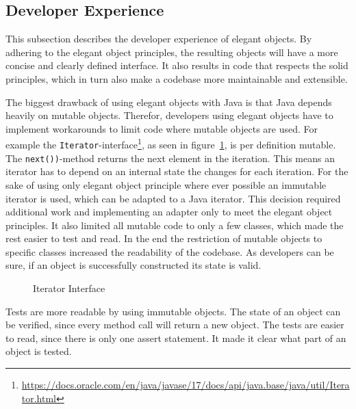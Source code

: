 \subsection{Developer Experience}\label{subsec:developer-experience}
This subsection describes the developer experience of elegant objects.
By adhering to the elegant object principles, the resulting objects will have a more concise and clearly defined interface.
It also results in code that respects the solid principles, which in turn also make a codebase more maintainable and extensible.

The biggest drawback of using elegant objects with Java is that Java depends heavily on mutable objects.
Therefor, developers using elegant objects have to implement workarounds to limit code where mutable objects are used.
For example the \texttt{Iterator}-interface\footnote{\url{https://docs.oracle.com/en/java/javase/17/docs/api/java.base/java/util/Iterator.html}}, as seen in figure\ \ref{fig:iterator}, is per definition mutable.
The \texttt{next())}-method returns the next element in the iteration.
This means an iterator has to depend on an internal state the changes for each iteration.
For the sake of using only elegant object principle where ever possible an immutable iterator is used, which can be adapted to a Java iterator.
This decision required additional work and implementing an adapter only to meet the elegant object principles.
It also limited all mutable code to only a few classes, which made the rest easier to test and read.
In the end the restriction of mutable objects to specific classes increased the readability of the codebase.
As developers can be sure, if an object is successfully constructed its state is valid.

\begin{figure}[h]
    \caption{Iterator Interface}
    
    \label{fig:iterator}
\end{figure}

Tests are more readable by using immutable objects.
The state of an object can be verified, since every method call will return a new object.
The tests are easier to read, since there is only one assert statement.
It made it clear what part of an object is tested.
